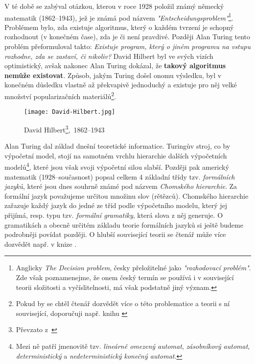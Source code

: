 V té době se zabýval otázkou, kterou v roce 1928 položil známý německý matematik  (1862--1943), jež je známá pod názvem \emph{"Entscheidungsproblem"}\footnote{Anglicky \emph{The Decision problem}, česky přeložitelné jako \emph{"rozhodovací problém"}. Zde však poznamenejme, že onem český termín se používá i v související teorii složitosti a vyčíslitelnosti, má však podstatně jiný význam.}. Problémem bylo, zda existuje algoritmus, který o každém tvrzení je schopný rozhodnout (v konečném čase), zda je či není pravdivé. Později Alan Turing tento problém přeformuloval takto: \emph{Existuje program, který o jiném programu na vstupu rozhodne, zda se zastaví, či nikoliv?} David Hilbert byl ve svých vizích optimistický, avšak nakonec Alan Turing dokázal, že \textbf{takový algoritmus nemůže existovat}. Způsob, jakým Turing došel onomu výsledku, byl v konečném důsledku vlastně až překvapivě jednoduchý a existuje pro něj velké množství popularizačních materiálů\footnote{Pokud by se chtěl čtenář dozvědět více o této problematice a teorii s ní související, doporučuji např. knihu \cite{Motwani2003}}.
\begin{figure}[h]
    \centering
    \texttt{[image: David-Hilbert.jpg]}
    \caption[David Hilbert,~1862--1943]{David Hilbert\footnote{Převzato z~\cite{OConnorHilbert2025}},~1862--1943}
    \label{fig:david-hilbert}
\end{figure}
Alan Turing dal základ dnešní teoretické informatice. Turingův stroj, co by výpočetní model, stojí na samotném vrchlu hierarchie dalších výpočetních modelů\footnote{Mezi ně patří jmenovitě tzv. \textit{lineárně omezený automat}, \emph{zásobníkový automat}, \emph{deterministický} a \emph{nedeterministický konečný automat}.}, které jsou však svoji výpočetní silou slabší.  Později pak americký matematik  (1928--současnost) popsal celkem 4 základní třídy tzv. \emph{formálních jazyků}, které jsou dnes souhrně známé pod názvem \emph{Chomského hierarchie}. Za formální jazyk považujeme určitou množinu slov (rětězců). Chomského hierarchie zařazuje každý jazyk do jedné ze tříd podle výpočetního modelu, který jej přijímá, resp. typu tzv. \emph{formální gramatiky}, která slova z něj generuje. O gramatikách a obecně určitém základu teorie formálních jazyků si ještě budeme podrobněji povídat později. O hlubší související teorii se čtenář může více dozvědět např. v knize \cite{Motwani2003}.

